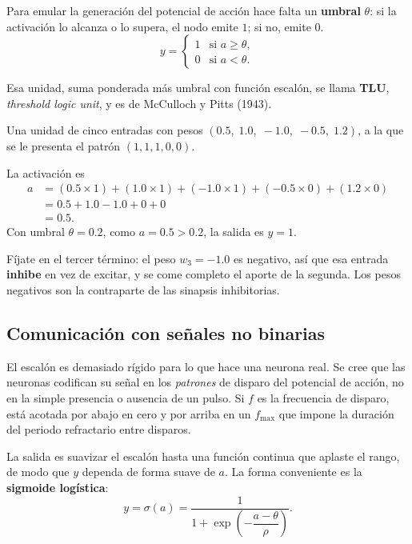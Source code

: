 \documentclass[11pt,letterpaper]{article}
\begin{document}
Para emular la generación del potencial de acción hace falta un
\textbf{umbral} $\theta$: si la activación lo alcanza o lo supera, el
nodo emite $1$; si no, emite $0$.
\[
    y = \begin{cases}
      1 & \text{si } a \geq \theta , \\
      0 & \text{si } a < \theta .
    \end{cases}
\]

\begin{definicion}
  Esa unidad, suma ponderada más umbral con función escalón, se llama
  \textbf{TLU}, \emph{threshold logic unit}, y es de McCulloch y
  Pitts (1943).
\end{definicion}

\begin{ejemplo}
  Una unidad de cinco entradas con pesos
  $(0.5,\; 1.0,\; -1.0,\; -0.5,\; 1.2)$, a la que se le presenta el
  patrón $(1, 1, 1, 0, 0)$.

  La activación es
  \begin{align*}
    a &= (0.5 \times 1) + (1.0 \times 1) + (-1.0 \times 1)
       + (-0.5 \times 0) + (1.2 \times 0) \\
      &= 0.5 + 1.0 - 1.0 + 0 + 0 \\
      &= 0.5 .
  \end{align*}
  Con umbral $\theta = 0.2$, como $a = 0.5 > 0.2$, la salida es
  $y = 1$.

  Fíjate en el tercer término: el peso $w_3 = -1.0$ es negativo, así
  que esa entrada \textbf{inhibe} en vez de excitar, y se come
  completo el aporte de la segunda. Los pesos negativos son la
  contraparte de las sinapsis inhibitorias.
\end{ejemplo}

\subsection*{Comunicación con señales no binarias}

El escalón es demasiado rígido para lo que hace una neurona real. Se
cree que las neuronas codifican su señal en los \emph{patrones} de
disparo del potencial de acción, no en la simple presencia o ausencia
de un pulso. Si $f$ es la frecuencia de disparo, está acotada por
abajo en cero y por arriba en un $f_{\max}$ que impone la duración
del periodo refractario entre disparos.

La salida es suavizar el escalón hasta una función continua que
aplaste el rango, de modo que $y$ dependa de forma suave de $a$. La
forma conveniente es la \textbf{sigmoide logística}:
\[
    y = \sigma(a) = \frac{1}{1 + \exp\!\left(
        -\dfrac{a - \theta}{\rho} \right)} .
\]
\end{document}
